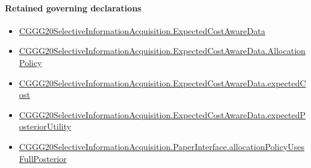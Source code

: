 \documentclass[10pt]{article}
\begin{document}
\paragraph{Retained governing declarations}
\begin{itemize}\raggedright
\item \hyperlink{governing-declaration-e85447991722be98}{CGGG20\allowbreak{}Selective\allowbreak{}Information\allowbreak{}Acquisition.\allowbreak{}Expected\allowbreak{}Cost\allowbreak{}Aware\allowbreak{}Data}
\item \hyperlink{governing-declaration-bce51b2002ecb9d2}{CGGG20\allowbreak{}Selective\allowbreak{}Information\allowbreak{}Acquisition.\allowbreak{}Expected\allowbreak{}Cost\allowbreak{}Aware\allowbreak{}Data.\allowbreak{}Allocation\allowbreak{}Policy}
\item \hyperlink{governing-declaration-2de4ff0d7ae0353e}{CGGG20\allowbreak{}Selective\allowbreak{}Information\allowbreak{}Acquisition.\allowbreak{}Expected\allowbreak{}Cost\allowbreak{}Aware\allowbreak{}Data.\allowbreak{}expected\allowbreak{}Cost}
\item \hyperlink{governing-declaration-6c7f8502bb3470f7}{CGGG20\allowbreak{}Selective\allowbreak{}Information\allowbreak{}Acquisition.\allowbreak{}Expected\allowbreak{}Cost\allowbreak{}Aware\allowbreak{}Data.\allowbreak{}expected\allowbreak{}Posterior\allowbreak{}Utility}
\item \hyperlink{governing-declaration-8b415bce6ab711e0}{CGGG20\allowbreak{}Selective\allowbreak{}Information\allowbreak{}Acquisition.\allowbreak{}Paper\allowbreak{}Interface.\allowbreak{}allocation\allowbreak{}Policy\allowbreak{}Uses\allowbreak{}Full\allowbreak{}Posterior}
\end{itemize}
\end{document}
